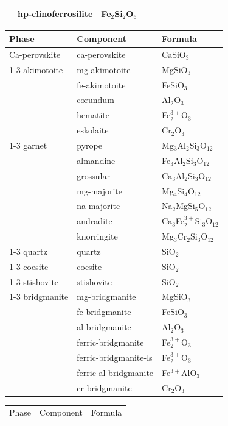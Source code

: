\begin{landscape}
\begin{table}[p]
{\begin{tabular}[t]{@{}l l l@{}}
 & hp-clinoferrosilite & Fe$_{2}$Si$_{2}$O$_{6}$ \\
\bottomrule
\end{tabular}
\hspace{2em}
\begin{tabular}[t]{@{}l l l@{}}
\toprule
Phase & Component & Formula \\
\midrule
Ca-perovskite & ca-perovskite & CaSiO$_{3}$ \\
\cmidrule{1-3}
akimotoite & mg-akimotoite & MgSiO$_{3}$ \\
 & fe-akimotoite & FeSiO$_{3}$ \\
 & corundum & Al$_{2}$O$_{3}$ \\
 & hematite & Fe$^{3+}_{2}$O$_{3}$ \\
 & eskolaite & Cr$_{2}$O$_{3}$ \\
\cmidrule{1-3}
garnet & pyrope & Mg$_{3}$Al$_{2}$Si$_{3}$O$_{12}$ \\
 & almandine & Fe$_{3}$Al$_{2}$Si$_{3}$O$_{12}$ \\
 & grossular & Ca$_{3}$Al$_{2}$Si$_{3}$O$_{12}$ \\
 & mg-majorite & Mg$_{4}$Si$_{4}$O$_{12}$ \\
 & na-majorite & Na$_{2}$MgSi$_{5}$O$_{12}$ \\
 & andradite & Ca$_{3}$Fe$^{3+}_{2}$Si$_{3}$O$_{12}$ \\
 & knorringite & Mg$_{3}$Cr$_{2}$Si$_{3}$O$_{12}$ \\
\cmidrule{1-3}
quartz & quartz & SiO$_{2}$ \\
\cmidrule{1-3}
coesite & coesite & SiO$_{2}$ \\
\cmidrule{1-3}
stishovite & stishovite & SiO$_{2}$ \\
\cmidrule{1-3}
bridgmanite & mg-bridgmanite & MgSiO$_{3}$ \\
 & fe-bridgmanite & FeSiO$_{3}$ \\
 & al-bridgmanite & Al$_{2}$O$_{3}$ \\
 & ferric-bridgmanite & Fe$^{3+}_{2}$O$_{3}$ \\
 & ferric-bridgmanite-ls & Fe$^{3+}_{2}$O$_{3}$ \\
 & ferric-al-bridgmanite & Fe$^{3+}$AlO$_{3}$ \\
 & cr-bridgmanite & Cr$_{2}$O$_{3}$ \\
\bottomrule
\end{tabular}
\hspace{2em}
\begin{tabular}[t]{@{}l l l@{}}
\toprule
Phase & Component & Formula \\

\end{tabular}}
\end{table}
\end{landscape}
